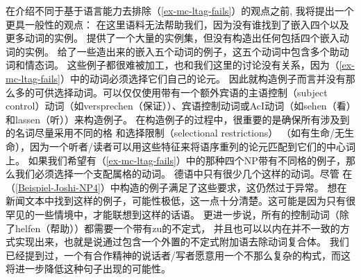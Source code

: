 在介绍不同于基于语言能力去排除（\ref{ex-mc-ltag-fails}）的观点之前, 我将提出一个更具一般性的观点：
在这里语料无法帮助我们，因为没有谁找到了嵌入四个以及更多动词的实例。 \citet{Bech55a}提供了一个大量的实例集，但没有构造出任何包括四个嵌入动词的实例。 \citet[--95]{Meurers99c}给了一些造出来的嵌入五个动词的例子，这五个动词中包含多个助动词和情态词。
这些例子都很难被加工，也和我们这里的讨论没有关系，因为（\ref{ex-mc-ltag-fails}）中的动词必须选择它们自己的论元。
因此就构造例子而言并没有那么多的可供选择动词。可以仅仅使用带有一个额外宾语的主语控制（subject control）动词（如versprechen（保证））、宾语控制动词或AcI动词（如sehen（看）和lassen（听））来构造例子。
在构造例子的过程中，很重要的是确保所有涉及到的名词尽量采用不同的格
和选择限制（selectional restrictions）
（如有生命/无生命），因为一个听者/读者可以用这些特征来将语序重列的论元匹配到它们的中心词上。
如果我们希望有（\ref{ex-mc-ltag-fails}）中的那种四个NP带有不同格的例子，那么我们必须选择一个支配属格的动词。
德语中只有很少几个这样的动词。尽管 \citet{JBR2000a}在（\ref{Beispiel-Joshi-NP4}）中构造的例子满足了这些要求，这仍然过于异常。
想在新闻文本中找到这样的例子，可能性极低，这一点十分清楚。这可能是因为只有很罕见的一些情境中，才能联想到这样的话语。
更进一步说，所有的控制动词（除了helfen（帮助））都需要一个带有zu的不定式，
并且也可以以内在并不一致的方式实现出来，也就是说通过包含一个外置的不定式附加语去除动词复合体。
我们已经提到过，一个有合作精神的说话者/写者愿意用一个不那么复杂的构式，而这将进一步降低这种句子出现的可能性。

